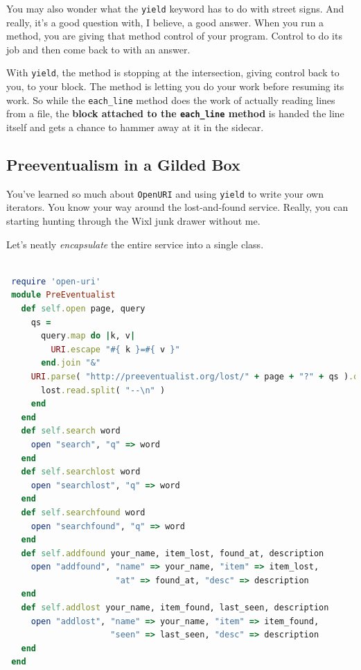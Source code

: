 \documentclass[10pt,twoside]{report}
\begin{document}
You may also wonder what the \lstinline[breaklines=true]|yield|
keyword has to do with street signs.  And really, it's a good question
with, I believe, a good answer.  When you run a method, you are giving
that method control of your program.  Control to do its job and then
come back to with an answer.

With \lstinline[breaklines=true]|yield|, the method is stopping at the
intersection, giving control back to you, to your block.  The method
is letting you do your work before resuming its work.  So while the
\lstinline[breaklines=true]|each_line| method does the work of
actually reading lines from a file, the {\bf block attached to the
  \lstinline[breaklines=true]|each_line| method} is handed the line
itself and gets a chance to hammer away at it in the sidecar.



\subsection{Preeventualism in a Gilded Box}



You've learned so much about \lstinline[breaklines=true]|OpenURI| and
using \lstinline[breaklines=true]|yield| to write your own
iterators. You know your way around the lost-and-found service.
Really, you can starting hunting through the Wixl junk drawer without
me.

Let's neatly {\em encapsulate} the entire service into a single class.


\begin{lstlisting}[basicstyle=\ttfamily\color{basiccolor},
    commentstyle = \ttfamily\color{commentcolor},
    keywordstyle=\ttfamily\color{keywordscolor},
    stringstyle=\color{stringcolor},
    language=Ruby,
    basicstyle=\small\ttfamily,
    showstringspaces=false,
  ]

 require 'open-uri'
 module PreEventualist
   def self.open page, query
     qs =
       query.map do |k, v|
         URI.escape "#{ k }=#{ v }"
       end.join "&"
     URI.parse( "http://preeventualist.org/lost/" + page + "?" + qs ).open do |lost|
       lost.read.split( "--\n" )
     end
   end
   def self.search word
     open "search", "q" => word
   end
   def self.searchlost word
     open "searchlost", "q" => word
   end
   def self.searchfound word
     open "searchfound", "q" => word
   end
   def self.addfound your_name, item_lost, found_at, description
     open "addfound", "name" => your_name, "item" => item_lost,
                      "at" => found_at, "desc" => description
   end
   def self.addlost your_name, item_found, last_seen, description
     open "addlost", "name" => your_name, "item" => item_found,
                     "seen" => last_seen, "desc" => description
   end
 end

\end{lstlisting}
\end{document}
